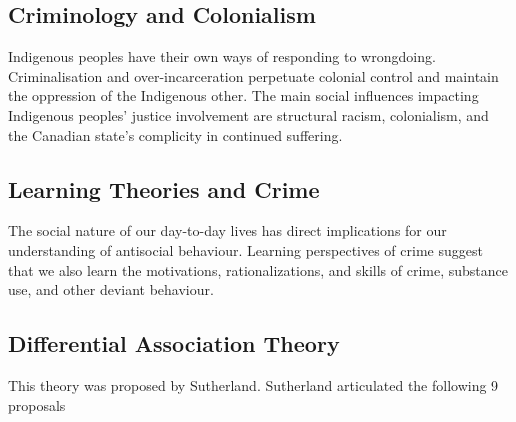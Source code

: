 \documentclass{article}
\begin{document}
\subsection{Criminology and Colonialism}

Indigenous peoples have their own ways of responding to wrongdoing. Criminalisation and over-incarceration perpetuate colonial control and maintain the oppression of the Indigenous other.	The main social influences impacting Indigenous peoples’ justice involvement are structural racism, colonialism, and the Canadian state’s complicity in continued suffering.

\subsection{Learning Theories and Crime}

The social nature of our day-to-day lives has direct implications for our understanding of antisocial behaviour. Learning perspectives of crime suggest that we also learn the motivations, rationalizations, and skills of crime, substance use, and other deviant behaviour.

\subsection{Differential Association Theory}

This theory was proposed by Sutherland. Sutherland articulated the following 9 proposals
\end{document}
